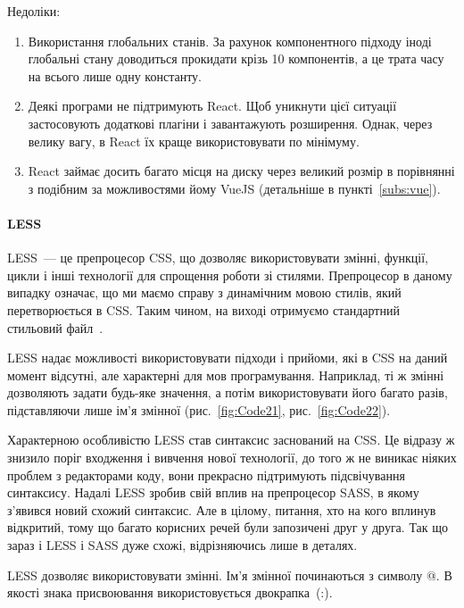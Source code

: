 Недоліки:
\begin{enumerate}
    \item Використання глобальних станів. За рахунок компонентного підходу іноді глобальні стану доводиться прокидати крізь 10 компонентів, а це трата часу на всього лише одну константу. 
    \item Деякі програми не підтримують React. Щоб уникнути цієї ситуації застосовують додаткові плагіни і завантажують розширення. Однак, через велику вагу, в React їх краще використовувати по мінімуму. 
    \item React займає досить багато місця на диску через великий розмір в порівнянні з подібним за можливостями йому VueJS (детальніше в пункті~\ref{subs:vue}).
\end{enumerate}

\paragraph{LESS}

LESS~--- це препроцесор CSS, що дозволяє використовувати змінні, функції, цикли і інші технології для спрощення роботи зі стилями. Препроцесор в даному випадку означає, що ми маємо справу з динамічним мовою стилів, який перетворюється в CSS. Таким чином, на виході отримуємо стандартний стильовий файл~\cite{9781782160663}.

LESS надає можливості використовувати підходи і прийоми, які в CSS на даний момент відсутні, але характерні для мов програмування. Наприклад, ті ж змінні дозволяють задати будь-яке значення, а потім використовувати його багато разів, підставляючи лише ім'я змінної (рис.~\ref{fig:Code21}, рис.~\ref{fig:Code22}).

Характерною особливістю LESS став синтаксис заснований на CSS. Це відразу ж знизило поріг входження і вивчення нової технології, до того ж не виникає ніяких проблем з редакторами коду, вони прекрасно підтримують підсвічування синтаксису. Надалі LESS зробив свій вплив на препроцесор SASS, в якому з'явився новий схожий синтаксис. Але в цілому, питання, хто на кого вплинув відкритий, тому що багато корисних речей були запозичені друг у друга. Так що зараз і LESS і SASS дуже схожі, відрізняючись лише в деталях.

LESS дозволяє використовувати змінні. Ім'я змінної починаються з символу @. В якості знака присвоювання використовується двокрапка~(:).


